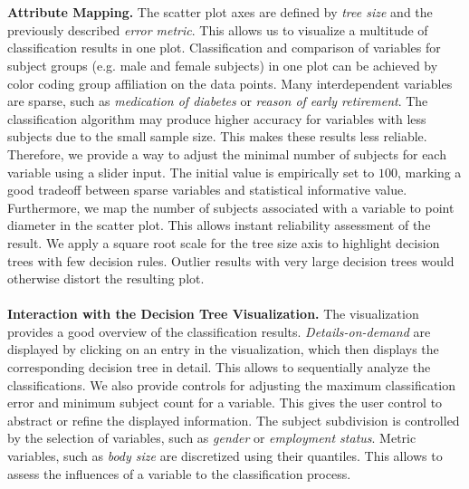 \documentclass[a4paper,twoside]{style/article}
\begin{document}
\\\\
\textbf{Attribute Mapping.}
The scatter plot axes are defined by \emph{tree size} and the previously described \emph{error metric}.
This allows us to visualize a multitude of classification results in one plot.
Classification and comparison of variables for subject groups (e.g. male and female subjects) in one plot can be achieved by color coding group affiliation on the data points.
Many interdependent variables are sparse, such as \emph{medication of diabetes} or \emph{reason of early retirement}.
The classification algorithm may produce higher accuracy for variables with less subjects due to the small sample size.
This makes these results less reliable.
Therefore, we provide a way to adjust the minimal number of subjects for each variable using a slider input.
The initial value is empirically set to $100$, marking a good tradeoff between sparse variables and statistical informative value.
Furthermore, we map the number of subjects associated with a variable to point diameter in the scatter plot.
This allows instant reliability assessment of the result.
We apply a square root scale for the tree size axis to highlight decision trees with few decision rules.
Outlier results with very large decision trees would otherwise distort the resulting plot.
\\\\
\noindent \textbf{Interaction with the Decision Tree Visualization.}
The visualization provides a good overview of the classification results.
\emph{Details-on-demand} are displayed by clicking on an entry in the visualization, which then displays the corresponding decision tree in detail.
This allows to sequentially analyze the classifications.
We also provide controls for adjusting the maximum classification error and minimum subject count for a variable.
This gives the user control to abstract or refine the displayed information.
The subject subdivision is controlled by the selection of variables, such as \emph{gender} or \emph{employment status}.
Metric variables, such as \emph{body size} are discretized using their quantiles.
This allows to assess the influences of a variable to the classification process.
\end{document}
